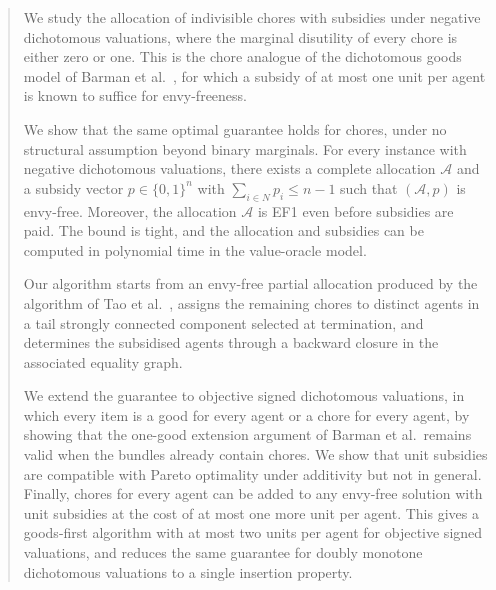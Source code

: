 \begin{abstract}
We study the allocation of indivisible chores with subsidies under negative dichotomous valuations, where the marginal disutility of
every chore is either zero or one. This is the chore analogue of the dichotomous goods model of Barman et al.~\cite{BKNS22}, for which a subsidy of at most one unit per agent is known to suffice for envy-freeness.

We show that the same optimal guarantee holds for chores, under no structural assumption beyond binary marginals. For every instance with negative dichotomous valuations, there exists a complete allocation $\mathcal{A}$ and a subsidy vector $p\in\{0,1\}^n$ with
\(
\sum_{i\in N} p_i\le n-1
\) such that $(\mathcal{A},p)$ is envy-free. Moreover, the allocation $\mathcal{A}$ is EF1 even before subsidies are paid. The bound is
tight, and the allocation and subsidies can be computed in polynomial time in the value-oracle model.

Our algorithm starts from an envy-free partial allocation produced by the algorithm of Tao et al.~\cite{TWYZ23}, assigns the remaining chores to distinct agents in a tail strongly connected component selected at termination, and determines the subsidised agents through a backward closure in the associated equality graph.

We extend the guarantee to objective signed dichotomous valuations, in which every item is a good for every agent or a chore for every agent, by showing that the one-good extension argument of Barman et al.\ remains valid when the bundles already contain chores. We show that unit subsidies are compatible with Pareto optimality under additivity but not in general. Finally, chores for every agent can be added to any envy-free solution with unit subsidies at the cost of at most one more unit per agent. This gives a goods-first algorithm with at most two units per agent for objective signed valuations, and reduces the same guarantee for doubly monotone dichotomous valuations to a single insertion property.
\end{abstract}



